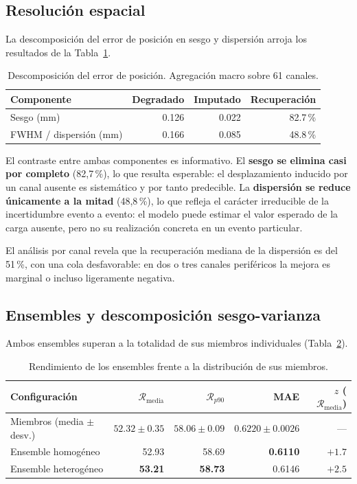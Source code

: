 \subsection{Resolución espacial}
\label{subsec:res-resolucion}

La descomposición del error de posición en sesgo y dispersión arroja los resultados de la
Tabla~\ref{tab:res-resolucion}.

\begin{table}[htbp]
\centering
\caption{Descomposición del error de posición. Agregación macro sobre 61 canales.}
\label{tab:res-resolucion}
\begin{tabular}{lrrr}
\toprule
\textbf{Componente} & \textbf{Degradado} & \textbf{Imputado} & \textbf{Recuperación} \\
\midrule
Sesgo (mm) & 0.126 & 0.022 & 82.7\,\% \\
FWHM / dispersión (mm) & 0.166 & 0.085 & 48.8\,\% \\
\bottomrule
\end{tabular}
\end{table}

El contraste entre ambas componentes es informativo. El \textbf{sesgo se elimina casi por completo}
(82,7\,\%), lo que resulta esperable: el desplazamiento inducido por un canal ausente es sistemático
y por tanto predecible. La \textbf{dispersión se reduce únicamente a la mitad} (48,8\,\%), lo que
refleja el carácter irreducible de la incertidumbre evento a evento: el modelo puede estimar el
valor esperado de la carga ausente, pero no su realización concreta en un evento particular.

El análisis por canal revela que la recuperación mediana de la dispersión es del 51\,\%, con una cola
desfavorable: en dos o tres canales periféricos la mejora es marginal o incluso ligeramente negativa.

\subsection{Ensembles y descomposición sesgo-varianza}
\label{subsec:res-ensemble}

Ambos ensembles superan a la totalidad de sus miembros individuales
(Tabla~\ref{tab:res-ensemble}).

\begin{table}[htbp]
\centering
\caption{Rendimiento de los ensembles frente a la distribución de sus miembros.}
\label{tab:res-ensemble}
\begin{tabular}{lrrrr}
\toprule
\textbf{Configuración} & $\mathcal{R}_{\text{media}}$ & $\mathcal{R}_{p90}$ & \textbf{MAE} & $z$ ($\mathcal{R}_{\text{media}}$) \\
\midrule
Miembros (media $\pm$ desv.) & $52.32 \pm 0.35$ & $58.06 \pm 0.09$ & $0.6220 \pm 0.0026$ & --- \\
Ensemble homogéneo & 52.93 & 58.69 & \textbf{0.6110} & $+1.7$ \\
Ensemble heterogéneo & \textbf{53.21} & \textbf{58.73} & 0.6146 & $+2.5$ \\
\bottomrule
\end{tabular}
\end{table}


